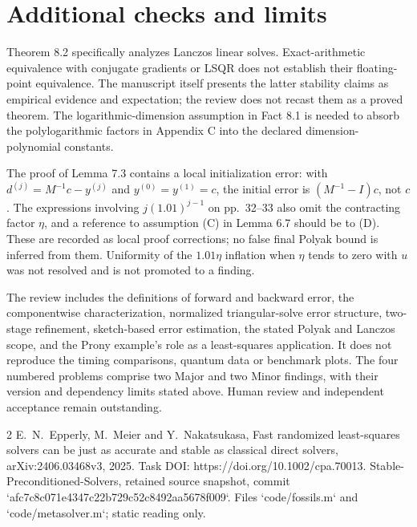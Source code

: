 \documentclass[10pt]{article}
\begin{document}
\section*{Additional checks and limits}
Theorem 8.2 specifically analyzes Lanczos linear solves. Exact-arithmetic equivalence with conjugate gradients or LSQR does not establish their floating-point equivalence. The manuscript itself presents the latter stability claims as empirical evidence and expectation; the review does not recast them as a proved theorem. The logarithmic-dimension assumption in Fact 8.1 is needed to absorb the polylogarithmic factors in Appendix C into the declared dimension-polynomial constants.\par
The proof of Lemma 7.3 contains a local initialization error: with \(d^{(j)}=M^{-1}c-y^{(j)}\) and \(y^{(0)}=y^{(1)}=c\), the initial error is \((M^{-1}-I)c\), not \(c\). The expressions involving \(j(1.01)^{j-1}\) on pp. 32–33 also omit the contracting factor \(\eta\), and a reference to assumption (C) in Lemma 6.7 should be to (D). These are recorded as local proof corrections; no false final Polyak bound is inferred from them. Uniformity of the \(1.01\eta\) inflation when \(\eta\) tends to zero with \(u\) was not resolved and is not promoted to a finding.\par
The review includes the definitions of forward and backward error, the componentwise characterization, normalized triangular-solve error structure, two-stage refinement, sketch-based error estimation, the stated Polyak and Lanczos scope, and the Prony example’s role as a least-squares application. It does not reproduce the timing comparisons, quantum data or benchmark plots. The four numbered problems comprise two Major and two Minor findings, with their version and dependency limits stated above. Human review and independent acceptance remain outstanding.\par
2 E. N. Epperly, M. Meier and Y. Nakatsukasa, Fast randomized least-squares solvers can be just as accurate and stable as classical direct solvers, arXiv:2406.03468v3, 2025. Task DOI: https://doi.org/10.1002/cpa.70013. Stable-Preconditioned-Solvers, retained source snapshot, commit `afc7c8c071e4347c22b729c52c8492aa5678f009`. Files `code/fossils.m` and `code/metasolver.m`; static reading only.\par
\end{document}
